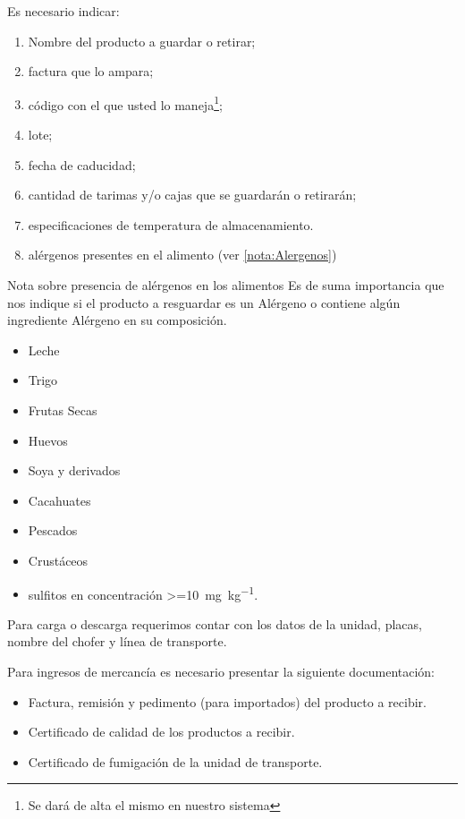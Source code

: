 Es necesario indicar:
\begin{enumerate}
	\item Nombre del producto a guardar o retirar;
	\item factura que lo ampara;
	\item código con el que usted lo maneja\footnote{Se dará de alta el mismo en nuestro sistema};
	\item lote;
	\item fecha de caducidad;
	\item cantidad de tarimas y/o cajas que se guardarán o retirarán;
	\item especificaciones de temperatura de almacenamiento.
	\item alérgenos presentes en el \gls{alimento} (ver \cref{nota:Alergenos})
\end{enumerate}

\begin{nota}{Nota sobre presencia de alérgenos en los \glspl{alimento}}
\label{nota:Alergenos}
Es de suma importancia que nos indique si el producto a resguardar es un Alérgeno o contiene algún ingrediente Alérgeno en su composición.

\begin{itemize}
	\item Leche
	\item Trigo
	\item Frutas Secas
	\item Huevos
	\item Soya y derivados
	\item Cacahuates
	\item Pescados
	\item Crustáceos
	\item sulfitos en concentración \qty{>=10}{\milli\gram\per\kilo\gram}.
\end{itemize}

\end{nota}

Para carga o descarga requerimos contar con los datos de la unidad, placas, nombre del chofer y línea de transporte.

Para ingresos de mercancía es necesario presentar la siguiente documentación:

\begin{itemize}
	\item Factura, remisión y pedimento (para importados) del producto a recibir.
	\item Certificado de calidad de los productos a recibir.
	\item Certificado de fumigación de la unidad de transporte.
\end{itemize}

